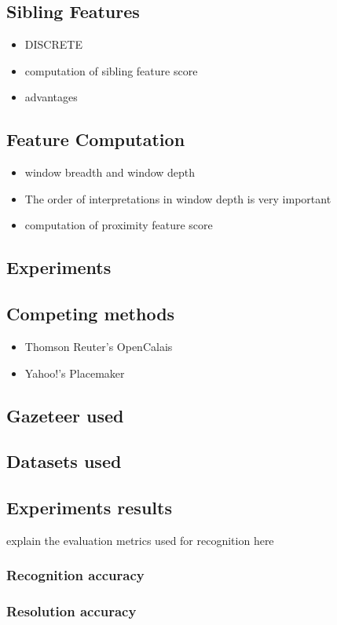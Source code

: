 \documentclass[
     11pt,         %
     a4paper,      %
     oneside,
     ]{article}
\begin{document}
\subsection{Sibling Features}
\begin{itemize}
	\item DISCRETE
	\item computation of sibling feature score
	\item advantages
\end{itemize}
\subsection{Feature Computation}
\begin{itemize}
	\item window breadth and window depth
	\item The order of interpretations in window depth is very important
	\item computation of proximity feature score
\end{itemize}

\subsection{Experiments}
\subsection{Competing methods}
\begin{itemize}
	\item Thomson Reuter's OpenCalais
	\item Yahoo!'s Placemaker
\end{itemize}
\subsection{Gazeteer used}
\subsection{Datasets used}
\subsection{Experiments results}
explain the evaluation metrics used for recognition here
\subsubsection{Recognition accuracy}
\subsubsection{Resolution accuracy}
\end{document}
